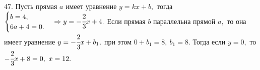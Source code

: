 47. Пусть прямая $a$ имеет уравнение $y=kx+b,$ тогда $\begin{cases}b=4,\\6a+4=0.\end{cases}\Rightarrow y=-\cfrac{2}{3}x+4.$ Если прямая $b$ параллельна прямой $a,$ то она имеет уравнение $y=-\cfrac{2}{3}x+b_1,$ при этом $0+b_1=8,\ b_1=8.$ Тогда если $y=0,$ то $-\cfrac{2}{3}x+8=0,\ x=12.$\\

